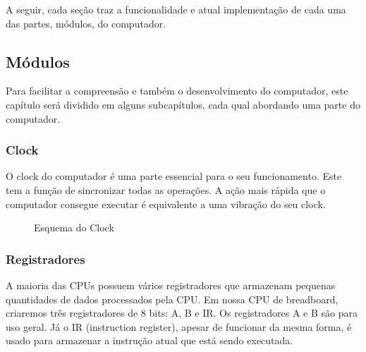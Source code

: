 A seguir, cada seção traz a funcionalidade e atual implementação de cada uma das partes, módulos, do computador.





\subsection{Módulos}
Para facilitar a compreensão e também o desenvolvimento do computador, este capítulo será dividido em alguns subcapítulos, cada qual abordando uma parte do computador.

\subsubsection{Clock}
O clock do computador é uma parte essencial para o seu funcionamento. Este tem a função de sincronizar todas as operações. A ação mais rápida que o computador consegue executar é equivalente a uma vibração do seu clock.

\vspace{1cm}
\begin{figure}[H] \centering 
  \caption{\label{schematics_clock} Esquema do Clock} 
\end{figure}

\subsubsection{Registradores}
A maioria das CPUs possuem vários registradores que armazenam pequenas quantidades de dados processados pela CPU. Em nossa CPU de breadboard, criaremos três registradores de 8 bits: A, B e IR. Os registradores A e B são para uso geral. Já o IR (instruction register), apesar de funcionar da mesma forma, é usado para armazenar a instrução atual que está sendo executada.

